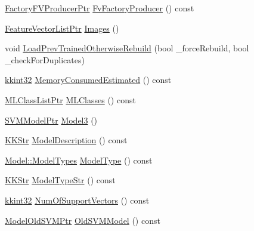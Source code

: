 \begin{DoxyCompactItemize}
\item 
\hyperlink{namespace_k_k_m_l_l_a82812d1feb85a6cff72d059bc67bb90e}{Factory\+F\+V\+Producer\+Ptr} \hyperlink{class_k_k_m_l_l_1_1_training_process2_a8298e1c8861592e5b7cc0bda7be9b59f}{Fv\+Factory\+Producer} () const 
\item 
\hyperlink{namespace_k_k_m_l_l_acf2ba92a3cf03e2b19674b24ff488ef6}{Feature\+Vector\+List\+Ptr} \hyperlink{class_k_k_m_l_l_1_1_training_process2_ae25d140514d9d371eadff2689916a15f}{Images} ()
\item 
void \hyperlink{class_k_k_m_l_l_1_1_training_process2_a9af01700d328f734dcb9d2e372fe280a}{Load\+Prev\+Trained\+Otherwise\+Rebuild} (bool \+\_\+force\+Rebuild, bool \+\_\+check\+For\+Duplicates)
\item 
\hyperlink{namespace_k_k_b_a8fa4952cc84fda1de4bec1fbdd8d5b1b}{kkint32} \hyperlink{class_k_k_m_l_l_1_1_training_process2_ad418b0d8e1411887a585d94f2cc218a5}{Memory\+Consumed\+Estimated} () const 
\item 
\hyperlink{namespace_k_k_m_l_l_af091cde3f4a4315658b41a5e7583fc26}{M\+L\+Class\+List\+Ptr} \hyperlink{class_k_k_m_l_l_1_1_training_process2_a3fb6ed37136259e14f5c983077c2fa85}{M\+L\+Classes} () const 
\item 
\hyperlink{namespace_k_k_m_l_l_ab9364c3a3533933d050a3e9a3490e13a}{S\+V\+M\+Model\+Ptr} \hyperlink{class_k_k_m_l_l_1_1_training_process2_a0c7e34ff343c2d77b111441dfb990268}{Model3} ()
\item 
\hyperlink{class_k_k_b_1_1_k_k_str}{K\+K\+Str} \hyperlink{class_k_k_m_l_l_1_1_training_process2_a24b79caa21bb8cfa2d74ec0ef5d2ed1c}{Model\+Description} () const 
\item 
\hyperlink{class_k_k_m_l_l_1_1_model_aeda4060e088c67446ca993eefcecea06}{Model\+::\+Model\+Types} \hyperlink{class_k_k_m_l_l_1_1_training_process2_a50546ab7ebdab244d318f9f0831c7e1c}{Model\+Type} () const 
\item 
\hyperlink{class_k_k_b_1_1_k_k_str}{K\+K\+Str} \hyperlink{class_k_k_m_l_l_1_1_training_process2_a40ca6e4fcb08800ddb6895a106e7d896}{Model\+Type\+Str} () const 
\item 
\hyperlink{namespace_k_k_b_a8fa4952cc84fda1de4bec1fbdd8d5b1b}{kkint32} \hyperlink{class_k_k_m_l_l_1_1_training_process2_adb643f3c56be4593dbabda9abd849273}{Num\+Of\+Support\+Vectors} () const 
\item 
\hyperlink{namespace_k_k_m_l_l_ab771fc915ce1e4f2c938a942923ad8b7}{Model\+Old\+S\+V\+M\+Ptr} \hyperlink{class_k_k_m_l_l_1_1_training_process2_acbffba5c88bcccf54724042a0bea38c0}{Old\+S\+V\+M\+Model} () const 

\end{DoxyCompactItemize}
